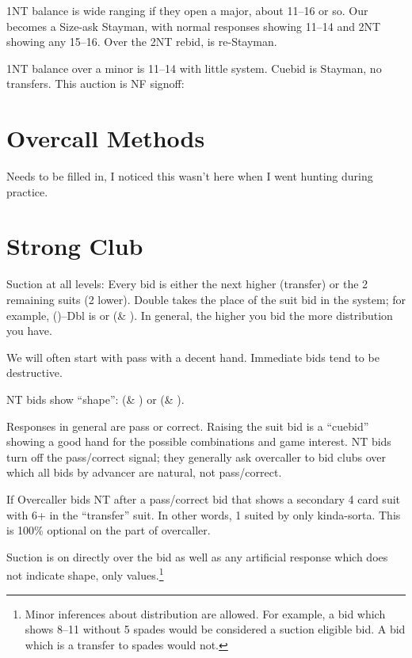 \documentclass[tom-ari]{subfile}
\begin{document}
	1NT balance is wide ranging if they open a major, about 11--16 or so. Our  becomes a Size-ask Stayman, with normal responses showing 11--14 and 2NT showing any 15--16. Over the 2NT rebid,  is re-Stayman.
	
	1NT balance over a minor is 11--14 with little system. Cuebid is Stayman, no transfers. This auction is NF signoff:
	
	
	\section{Overcall Methods}
	
		Needs to be filled in, I noticed this wasn't here when I went hunting during practice.
	
	\section{Strong Club}
	
	Suction at all levels: Every bid is either the next higher (transfer) or the 2 remaining suits (2 lower). Double takes the place of the suit bid in the system; for example, ()--Dbl is \diamondsuit or (\heartsuit \& \spadesuit). In general, the higher you bid the more distribution you have. 
	
	We will often start with pass with a decent hand. Immediate bids tend to be destructive.
	
	NT bids show ``shape'': (\diamondsuit \& \spadesuit) or (\clubsuit \& \heartsuit).
	
	Responses in general are pass or correct. Raising the suit bid is a ``cuebid'' showing a good hand for the possible combinations and game interest. NT bids turn off the pass/correct signal; they generally ask overcaller to bid clubs over which all bids by advancer are natural, not pass/correct.
	
	If Overcaller bids NT after a pass/correct bid that shows a secondary 4 card suit with 6+ in the ``transfer'' suit. In other words, 1 suited by only kinda-sorta. This is 100\% optional on the part of overcaller.
	
	Suction is on directly over the  bid as well as any artificial response which does not indicate shape, only values.\footnote{Minor inferences about distribution are allowed. For example, a  bid which shows 8--11 without 5 spades would be considered a suction eligible bid. A  bid which is a transfer to spades would not.}
	
\end{document}
